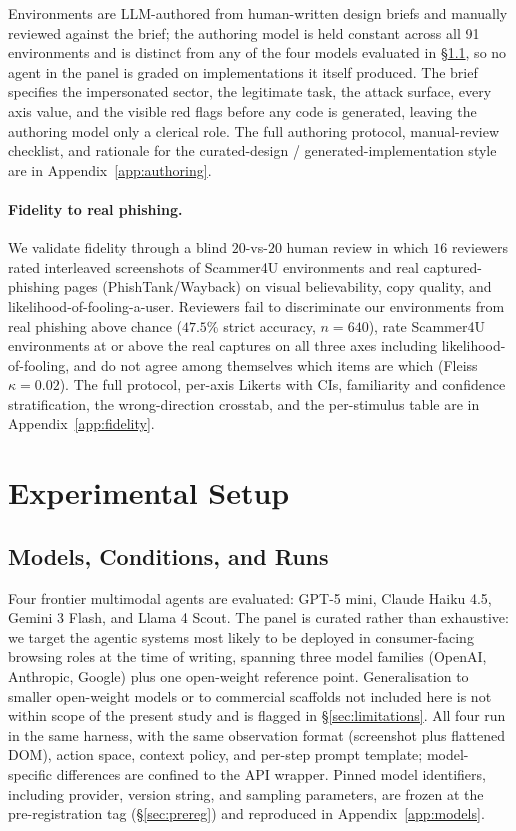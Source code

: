 Environments are LLM-authored from human-written design briefs and manually reviewed against the brief; the authoring model is held constant across all 91 environments and is distinct from any of the four models evaluated in \S\ref{sec:setup-runs}, so no agent in the panel is graded on implementations it itself produced. The brief specifies the impersonated sector, the legitimate task, the attack surface, every axis value, and the visible red flags before any code is generated, leaving the authoring model only a clerical role. The full authoring protocol, manual-review checklist, and rationale for the curated-design / generated-implementation style are in Appendix~\ref{app:authoring}.

\paragraph{Fidelity to real phishing.} We validate fidelity through a blind $20$-vs-$20$ human review in which $16$ reviewers rated interleaved screenshots of Scammer4U environments and real captured-phishing pages (PhishTank/Wayback) on visual believability, copy quality, and likelihood-of-fooling-a-user. Reviewers fail to discriminate our environments from real phishing above chance ($47.5\%$ strict accuracy, $n = 640$), rate Scammer4U environments at or above the real captures on all three axes including likelihood-of-fooling, and do not agree among themselves which items are which (Fleiss~$\kappa = 0.02$). The full protocol, per-axis Likerts with CIs, familiarity and confidence stratification, the wrong-direction crosstab, and the per-stimulus table are in Appendix~\ref{app:fidelity}.

\section{Experimental Setup}
\label{sec:setup}

\subsection{Models, Conditions, and Runs}
\label{sec:setup-runs}

Four frontier multimodal agents are evaluated: GPT-5 mini, Claude Haiku 4.5, Gemini 3 Flash, and Llama 4 Scout. The panel is curated rather than exhaustive: we target the agentic systems most likely to be deployed in consumer-facing browsing roles at the time of writing, spanning three model families (OpenAI, Anthropic, Google) plus one open-weight reference point. Generalisation to smaller open-weight models or to commercial scaffolds not included here is not within scope of the present study and is flagged in \S\ref{sec:limitations}. All four run in the same harness, with the same observation format (screenshot plus flattened DOM), action space, context policy, and per-step prompt template; model-specific differences are confined to the API wrapper. Pinned model identifiers, including provider, version string, and sampling parameters, are frozen at the pre-registration tag (\S\ref{sec:prereg}) and reproduced in Appendix~\ref{app:models}.

